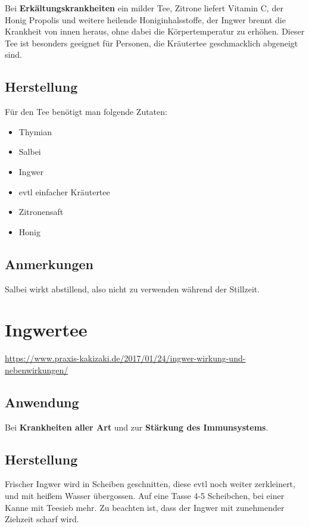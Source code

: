 Bei \textbf{Erkältungskrankheiten} ein milder Tee, Zitrone liefert Vitamin C, der Honig Propolis und weitere heilende Honiginhalsstoffe, der Ingwer brennt die Krankheit von innen heraus, ohne dabei die Körpertemperatur zu erhöhen. Dieser Tee ist besonders geeignet für Personen, die Kräutertee geschmacklich abgeneigt sind.

\subsection{Herstellung}

Für den Tee benötigt man folgende Zutaten:

\begin{itemize}
	\item Thymian
	\item Salbei
	\item Ingwer
	\item evtl einfacher Kräutertee
	\item Zitronensaft
	\item Honig
\end{itemize}


\subsection{Anmerkungen}

Salbei wirkt abstillend, also nicht zu verwenden während der Stillzeit.




\section{Ingwertee}

\url{https://www.praxis-kakizaki.de/2017/01/24/ingwer-wirkung-und-nebenwirkungen/}

\subsection{Anwendung}

Bei \textbf{Krankheiten aller Art} und zur \textbf{Stärkung des Immunsystems}.

\subsection{Herstellung}

Frischer Ingwer wird in Scheiben geschnitten, diese evtl noch weiter zerkleinert, und mit heißem Wasser übergossen. Auf eine Tasse 4-5 Scheibchen, bei einer Kanne mit Teesieb mehr. Zu beachten ist, dass der Ingwer mit zunehmender Ziehzeit scharf wird.

